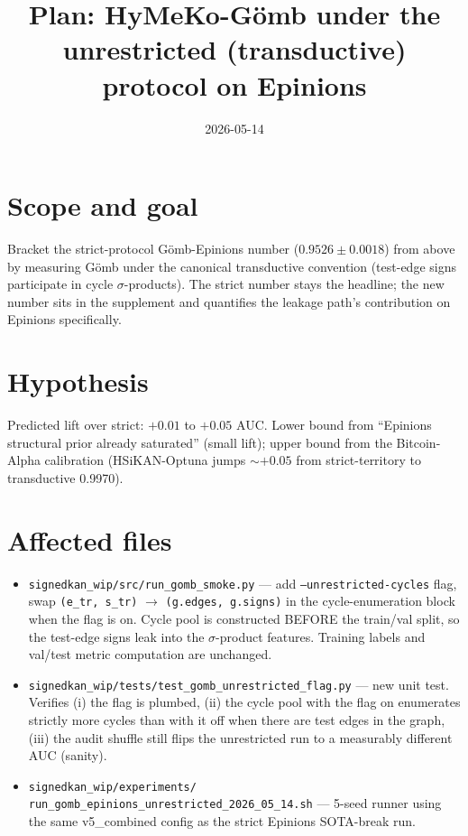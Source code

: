 \documentclass[11pt,a4paper]{article}
\title{Plan: HyMeKo-G\"omb under the unrestricted (transductive) protocol on Epinions}
\date{2026-05-14}
\author{}
\begin{document}
\maketitle

\section{Scope and goal}

Bracket the strict-protocol G\"omb-Epinions number ($0.9526 \pm
0.0018$) from above by measuring G\"omb under the canonical
transductive convention (test-edge signs participate in cycle
$\sigma$-products). The strict number stays the headline; the new
number sits in the supplement and quantifies the leakage path's
contribution on Epinions specifically.

\section{Hypothesis}

Predicted lift over strict: $+0.01$ to $+0.05$ AUC. Lower bound from
``Epinions structural prior already saturated'' (small lift);
upper bound from the Bitcoin-Alpha calibration (HSiKAN-Optuna jumps
$\sim +0.05$ from strict-territory to transductive 0.9970).

\section{Affected files}

\begin{itemize}
\item \texttt{signedkan\_wip/src/run\_gomb\_smoke.py} --- add
  \texttt{--unrestricted-cycles} flag, swap \texttt{(e\_tr, s\_tr)}
  $\to$ \texttt{(g.edges, g.signs)} in the cycle-enumeration block
  when the flag is on. Cycle pool is constructed BEFORE the
  train/val split, so the test-edge signs leak into the
  $\sigma$-product features. Training labels and val/test metric
  computation are unchanged.
\item \texttt{signedkan\_wip/tests/test\_gomb\_unrestricted\_flag.py}
  --- new unit test. Verifies (i) the flag is plumbed,
  (ii) the cycle pool with the flag on enumerates strictly more
  cycles than with it off when there are test edges in the graph,
  (iii) the audit shuffle still flips the unrestricted run to a
  measurably different AUC (sanity).
\item \texttt{signedkan\_wip/experiments/\\
  run\_gomb\_epinions\_unrestricted\_2026\_05\_14.sh} --- 5-seed
  runner using the same v5\_combined config as the strict Epinions
  SOTA-break run.
\end{itemize}
\end{document}
